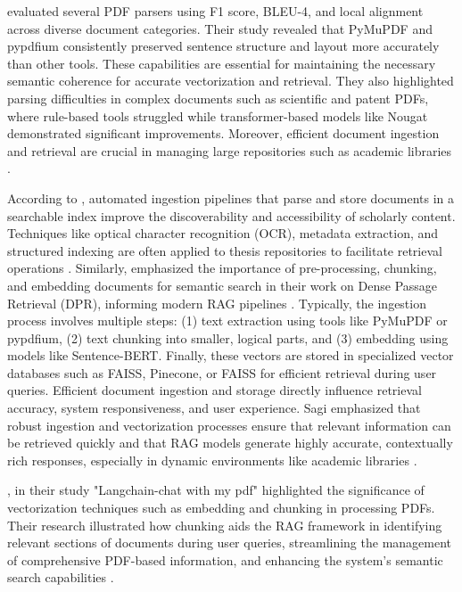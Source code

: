 \begin{refsection}
\bigbreak
 \citeauthor{adhikari2024comparative} \citeyear{adhikari2024comparative} evaluated several PDF parsers using F1 score, BLEU-4, and local alignment across diverse document categories. Their study revealed that PyMuPDF and pypdfium consistently preserved sentence structure and layout more accurately than other tools. These capabilities are essential for maintaining the necessary semantic coherence for accurate vectorization and retrieval. They also highlighted parsing difficulties in complex documents such as scientific and patent PDFs, where rule-based tools struggled while transformer-based models like Nougat demonstrated significant improvements. Moreover, efficient document ingestion and retrieval are crucial in managing large repositories such as academic libraries \cite{adhikari2024comparative}.

According to \citeauthor{zhang2023automated} \citeyear{zhang2023automated}, automated ingestion pipelines that parse and store documents in a searchable index improve the discoverability and accessibility of scholarly content. 
\newpage
\clearpage
Techniques like optical character recognition (OCR), metadata extraction, and structured indexing are often applied to thesis repositories to facilitate retrieval operations \cite{zhang2023automated}. Similarly, \citeauthor{karpukhin2020dense} \citeyear{karpukhin2020dense} emphasized the importance of pre-processing, chunking, and embedding documents for semantic search in their work on Dense Passage Retrieval (DPR), informing modern RAG pipelines \cite{karpukhin2020dense}. Typically, the ingestion process involves multiple steps: (1) text extraction using tools like PyMuPDF or pypdfium, (2) text chunking into smaller, logical parts, and (3) embedding using models like Sentence-BERT. Finally, these vectors are stored in specialized vector databases such as FAISS, Pinecone, or FAISS for efficient retrieval during user queries. Efficient document ingestion and storage directly influence retrieval accuracy, system responsiveness, and user experience. Sagi emphasized that robust ingestion and vectorization processes ensure that relevant information can be retrieved quickly and that RAG models generate highly accurate, contextually rich responses, especially in dynamic environments like academic libraries \cite{karpukhin2020dense}.

\bigbreak
\citeauthor{deepak2025langchain} \citeyear{deepak2025langchain}, in their study "Langchain-chat with my pdf" highlighted the significance of vectorization techniques such as embedding and chunking in processing PDFs. Their research illustrated how chunking aids the RAG framework in identifying relevant sections of documents during user queries, streamlining the management of comprehensive PDF-based information, and enhancing the system's semantic search capabilities \cite{deepak2025langchain}.


\end{refsection}
